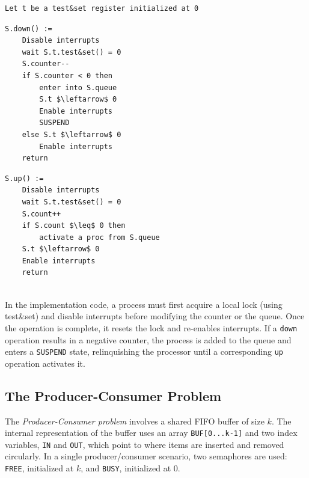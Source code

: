 \begin{minipage}{\textwidth}
\begin{lstlisting}[mathescape]
Let t be a test&set register initialized at 0
\end{lstlisting}
\begin{minipage}{0.45\textwidth}
\begin{lstlisting}[mathescape]
S.down() :=
    Disable interrupts
    wait S.t.test&set() = 0
    S.counter--
    if S.counter < 0 then
        enter into S.queue
        S.t $\leftarrow$ 0
        Enable interrupts
        SUSPEND
    else S.t $\leftarrow$ 0
        Enable interrupts
    return
\end{lstlisting}
\end{minipage}
\hfill
\begin{minipage}{0.45\textwidth}
\begin{lstlisting}[mathescape]
S.up() :=
    Disable interrupts
    wait S.t.test&set() = 0
    S.count++
    if S.count $\leq$ 0 then
        activate a proc from S.queue
    S.t $\leftarrow$ 0
    Enable interrupts
    return
\end{lstlisting}
\end{minipage}
\end{minipage}\\

In the implementation code, a process must first acquire a local lock (using test\&set) and disable interrupts before modifying the counter or the queue. Once the operation is complete, it resets the lock and re-enables interrupts. If a \texttt{down} operation results in a negative counter, the process is added to the queue and enters a \texttt{SUSPEND} state, relinquishing the processor until a corresponding \texttt{up} operation activates it.

\subsection{The Producer-Consumer Problem}
The \textit{Producer-Consumer problem} involves a shared FIFO buffer of size $k$. The internal representation of the buffer uses an array \texttt{BUF[0...k-1]} and two index variables, \texttt{IN} and \texttt{OUT}, which point to where items are inserted and removed circularly. In a single producer/consumer scenario, two semaphores are used: \texttt{FREE}, initialized at $k$, and \texttt{BUSY}, initialized at 0.

